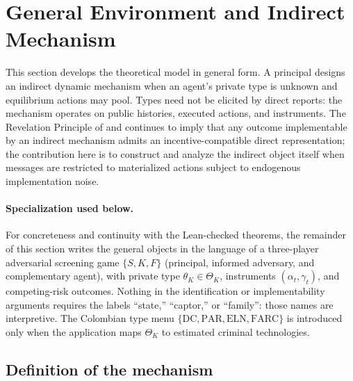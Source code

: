 \documentclass[review,authoryear,12pt]{elsarticle}
\theoremstyle{plain}
\theoremstyle{definition}
\newcommand{\ThetaK}{\Theta_K}
\newcommand{\1}{\mathbf{1}}
\begin{document}
\section{General Environment and Indirect Mechanism}\label{sec:model}

This section develops the theoretical model in general form. A principal designs an indirect dynamic mechanism when an agent's private type is unknown and equilibrium actions may pool. Types need not be elicited by direct reports: the mechanism operates on public histories, executed actions, and instruments. The Revelation Principle of \citet{Gibbard1973} and \citet{Myerson1979IC,Myerson1981} continues to imply that any outcome implementable by an indirect mechanism admits an incentive-compatible direct representation; the contribution here is to construct and analyze the indirect object itself when messages are restricted to materialized actions subject to endogenous implementation noise.

\paragraph{Specialization used below.}
For concreteness and continuity with the Lean-checked theorems, the remainder of this section writes the general objects in the language of a three-player adversarial screening game $\{S,K,F\}$ (principal, informed adversary, and complementary agent), with private type $\theta_K\in\ThetaK$, instruments $(\alpha_t,\gamma_t)$, and competing-risk outcomes. Nothing in the identification or implementability arguments requires the labels ``state,'' ``captor,'' or ``family'': those names are interpretive. The Colombian type menu $\{\mathrm{DC},\mathrm{PAR},\mathrm{ELN},\mathrm{FARC}\}$ is introduced only when the application maps $\ThetaK$ to estimated criminal technologies.

\subsection{Definition of the mechanism}\label{subsec:def-mecanismo}
\end{document}
